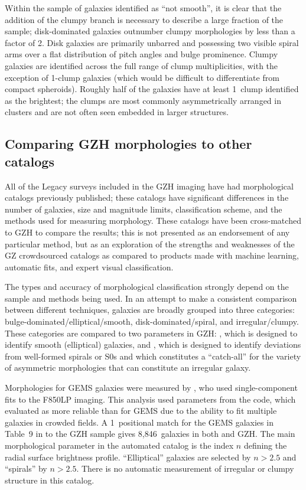 \documentclass[twocolumn]{aastex6}
\begin{document}
Within the sample of galaxies identified as ``not smooth'', it is clear that the addition of the clumpy branch is necessary to describe a large fraction of the sample; disk-dominated galaxies outnumber clumpy morphologies by less than a factor of 2. Disk galaxies are primarily unbarred \citet{mel14} and possessing two visible spiral arms over a flat distribution of pitch angles and bulge prominence. Clumpy galaxies are identified across the full range of clump multiplicities, with the exception of 1-clump galaxies (which would be difficult to differentiate from compact spheroids). Roughly half of the galaxies have at least 1~clump identified as the brightest; the clumps are most commonly asymmetrically arranged in clusters and are not often seen embedded in larger structures. 

\subsection{Comparing GZH morphologies to other catalogs}\label{ssec:comparisons}

All of the Legacy surveys included in the GZH imaging have had morphological catalogs previously published; these catalogs have significant differences in the number of galaxies, size and magnitude limits, classification scheme, and the methods used for measuring morphology. These catalogs have been cross-matched to GZH to compare the results; this is not presented as an endorsement of any particular method, but as an exploration of the strengths and weaknesses of the GZ crowdsourced catalogs as compared to products made with machine learning, automatic fits, and expert visual classification. 

The types and accuracy of morphological classification strongly depend on the sample and methods being used. In an attempt to make a consistent comparison between different techniques, galaxies are broadly grouped into three categories: bulge-dominated/elliptical/smooth, disk-dominated/spiral, and irregular/clumpy. These categories are compared to two parameters in GZH: \fbest, which is designed to identify smooth (elliptical) galaxies, and \fodd, which is designed to identify deviations from well-formed spirals or S0s and which constitutes a ``catch-all'' for the variety of asymmetric morphologies that can constitute an irregular galaxy. 

Morphologies for GEMS galaxies were measured by \citet{hau07}, who used single-component \sersic{} fits to the F850LP imaging. This analysis used parameters from the \galfit{} code, which \citet{hau07} evaluated as more reliable than \gimtwod{} for GEMS due to the ability to fit multiple galaxies in crowded fields. A 1\arcsec~positional match for the GEMS galaxies in Table~9 in \citet{hau07} to the GZH sample gives 8,846~galaxies in both \citet{hau07} and GZH. The main morphological parameter in the automated catalog is the \sersic{} index $n$ defining the radial surface brightness profile. ``Elliptical'' galaxies are selected by $n>2.5$ and ``spirals''  by $n>2.5$. There is no automatic measurement of irregular or clumpy structure in this catalog. 
\end{document}
